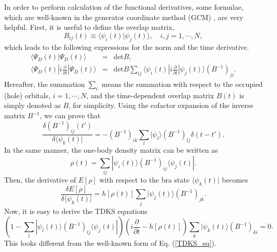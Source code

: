 \documentclass[twoside]{article}
\newcommand{\bra}[1]{\langle {#1} |}
\newcommand{\ket}[1]{| {#1} \rangle}
\newcommand{\inproduct}[2]{\langle #1 | #2 \rangle}
\begin{document}
{In order to perform calculation of the functional derivatives,
some formulae,
which are well-known in the generator coordinate method (GCM)
\cite{RS80}, are very helpful.
First, it is useful to define the overlap matrix,
\begin{equation}
B_{ij}(t)\equiv \inproduct{\psi_i(t)}{\psi_j(t)} ,
\quad i,j=1,\cdots, N ,
\end{equation}
which leads to the following expressions for the norm and the
time derivative.
\begin{eqnarray}
{\inproduct{\Psi_D(t)}{\Psi_D(t)}}
&=& \textrm{det}B , \\
\bra{\Psi_D(t)} i\frac{\partial}{\partial t} \ket{\Psi_D(t)}
&=& \textrm{det}B \sum_{ij} \bra{\psi_i(t)} 
i\frac{\partial}{\partial t} \ket{\psi_j(t)}
\left(B^{-1}\right)_{ji} .
\end{eqnarray}
Hereafter, the summation $\sum_i$ means the summation with respect
to the occupied (hole) orbitals, $i=1,\cdots, N$,
and the time-dependent overlap matrix $B(t)$ is simply denoted as $B$,
for simplicity.
Using the cofactor expansion of the inverse matrix $B^{-1}$,
we can prove that
\begin{equation}
\frac{\delta \left( B^{-1}\right)_{ij}(t')}{\delta \bra{\psi_k(t)}}
= - \left( B^{-1}\right)_{ik} \sum_l
 \ket{\psi_l} \left( B^{-1}\right)_{lj}
 \delta(t-t') .
\end{equation}
In the same manner, the one-body density matrix can be written as
\begin{equation}
\label{rho}
\rho(t) = \sum_{ij} \ket{\psi_i(t)}
\left( B^{-1}\right)_{ij}
\bra{\psi_j(t)} .
\end{equation}
Then, the derivative of $E[\rho]$ with respect to the bra state
$\bra{\psi_k(t)}$ becomes
\begin{equation}
\frac{\delta E[\rho]}{\delta \bra{\psi_k(t)}}
= h[\rho(t)] \sum_j \ket{\psi_j(t)} \left( B^{-1}\right)_{jk} .
\end{equation}
Now, it is easy to derive the TDKS equations
\begin{equation}
\label{TDKS_eq_2}
\left(
1-\sum_l \ket{\psi_l(t)}\left(B^{-1}\right)_{lj}\bra{\psi_j(t)}
\right)
\left( i\frac{\partial}{\partial t} - h[\rho(t)] \right)
\sum_k \ket{\psi_k(t)} \left(B^{-1}\right)_{ki}
= 0 .
\end{equation}
This looks different from the well-known form of Eq. (\ref{TDKS_eq}).

}
\end{document}
